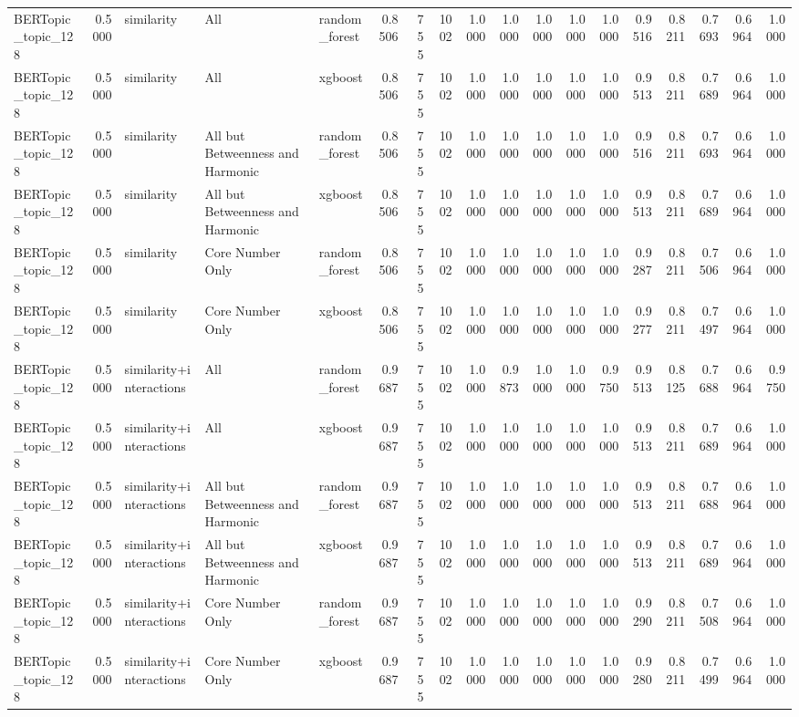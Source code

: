\begin{tabular}{lrlllrrrrrrrrrrrrr}
BERTopic_topic_128 & 0.5000 & similarity & All & random_forest & 0.8506 & 755 & 1002 & 1.0000 & 1.0000 & 1.0000 & 1.0000 & 1.0000 & 0.9516 & 0.8211 & 0.7693 & 0.6964 & 1.0000 \\
BERTopic_topic_128 & 0.5000 & similarity & All & xgboost & 0.8506 & 755 & 1002 & 1.0000 & 1.0000 & 1.0000 & 1.0000 & 1.0000 & 0.9513 & 0.8211 & 0.7689 & 0.6964 & 1.0000 \\
BERTopic_topic_128 & 0.5000 & similarity & All but Betweenness and Harmonic & random_forest & 0.8506 & 755 & 1002 & 1.0000 & 1.0000 & 1.0000 & 1.0000 & 1.0000 & 0.9516 & 0.8211 & 0.7693 & 0.6964 & 1.0000 \\
BERTopic_topic_128 & 0.5000 & similarity & All but Betweenness and Harmonic & xgboost & 0.8506 & 755 & 1002 & 1.0000 & 1.0000 & 1.0000 & 1.0000 & 1.0000 & 0.9513 & 0.8211 & 0.7689 & 0.6964 & 1.0000 \\
BERTopic_topic_128 & 0.5000 & similarity & Core Number Only & random_forest & 0.8506 & 755 & 1002 & 1.0000 & 1.0000 & 1.0000 & 1.0000 & 1.0000 & 0.9287 & 0.8211 & 0.7506 & 0.6964 & 1.0000 \\
BERTopic_topic_128 & 0.5000 & similarity & Core Number Only & xgboost & 0.8506 & 755 & 1002 & 1.0000 & 1.0000 & 1.0000 & 1.0000 & 1.0000 & 0.9277 & 0.8211 & 0.7497 & 0.6964 & 1.0000 \\
BERTopic_topic_128 & 0.5000 & similarity+interactions & All & random_forest & 0.9687 & 755 & 1002 & 1.0000 & 0.9873 & 1.0000 & 1.0000 & 0.9750 & 0.9513 & 0.8125 & 0.7688 & 0.6964 & 0.9750 \\
BERTopic_topic_128 & 0.5000 & similarity+interactions & All & xgboost & 0.9687 & 755 & 1002 & 1.0000 & 1.0000 & 1.0000 & 1.0000 & 1.0000 & 0.9513 & 0.8211 & 0.7689 & 0.6964 & 1.0000 \\
BERTopic_topic_128 & 0.5000 & similarity+interactions & All but Betweenness and Harmonic & random_forest & 0.9687 & 755 & 1002 & 1.0000 & 1.0000 & 1.0000 & 1.0000 & 1.0000 & 0.9513 & 0.8211 & 0.7688 & 0.6964 & 1.0000 \\
BERTopic_topic_128 & 0.5000 & similarity+interactions & All but Betweenness and Harmonic & xgboost & 0.9687 & 755 & 1002 & 1.0000 & 1.0000 & 1.0000 & 1.0000 & 1.0000 & 0.9513 & 0.8211 & 0.7689 & 0.6964 & 1.0000 \\
BERTopic_topic_128 & 0.5000 & similarity+interactions & Core Number Only & random_forest & 0.9687 & 755 & 1002 & 1.0000 & 1.0000 & 1.0000 & 1.0000 & 1.0000 & 0.9290 & 0.8211 & 0.7508 & 0.6964 & 1.0000 \\
BERTopic_topic_128 & 0.5000 & similarity+interactions & Core Number Only & xgboost & 0.9687 & 755 & 1002 & 1.0000 & 1.0000 & 1.0000 & 1.0000 & 1.0000 & 0.9280 & 0.8211 & 0.7499 & 0.6964 & 1.0000 \\

\end{tabular}

